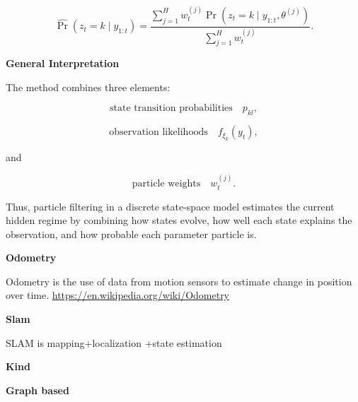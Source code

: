 \documentclass{book}
\providecommand{\ProjectDeepHeading}[2]{%
    \par\medskip\noindent\textbf{#2}\par\smallskip
}
\begin{document}
        \[
            \widehat{\Pr}
            \left(
                z_t = k
                \mid
                y_{1:t}
            \right)
            =
            \frac{
                \sum_{j=1}^{H}
                w_t^{(j)}
                \Pr
                \left(
                    z_t = k
                    \mid
                    y_{1:t},
                    \ensuremath{\theta}^{(j)}
                \right)
            }{
                \sum_{j=1}^{H}
                w_t^{(j)}
            }.
        \]
    
    
    \ProjectDeepHeading{11}{General Interpretation}
        
        The method combines three elements:
        
        \[
            \text{state transition probabilities}
            \quad
            p_{kl},
        \]
        
        \[
            \text{observation likelihoods}
            \quad
            f_{\ensuremath{\xi}_k}(y_t),
        \]
        
        and
        
        \[
            \text{particle weights}
            \quad
            w_t^{(j)}.
        \]
        
        Thus, particle filtering in a discrete state-space model estimates the current hidden regime by combining how states evolve, how well each state explains the observation, and how probable each parameter particle is.

\ProjectDeepHeading{5}{Odometry}


Odometry is the use of data from motion sensors to estimate change in position over time. \url{https://en.wikipedia.org/wiki/Odometry}

\ProjectDeepHeading{5}{Slam}


SLAM is mapping+localization +state estimation

\ProjectDeepHeading{6}{Kind}

\ProjectDeepHeading{7}{Graph based}

\end{document}
